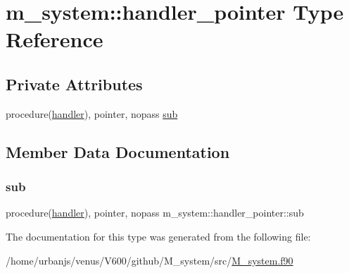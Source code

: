 \hypertarget{structm__system_1_1handler__pointer}{}\section{m\+\_\+system\+:\+:handler\+\_\+pointer Type Reference}
\label{structm__system_1_1handler__pointer}
\subsection*{Private Attributes}
\begin{DoxyCompactItemize}
\item 
procedure(\mbox{\hyperlink{interfacem__system_1_1handler}{handler}}), pointer, nopass \mbox{\hyperlink{structm__system_1_1handler__pointer_a34d58a6a4aa11ced30911c95d25eb48a}{sub}}
\end{DoxyCompactItemize}


\subsection{Member Data Documentation}
\mbox{\label{structm__system_1_1handler__pointer_a34d58a6a4aa11ced30911c95d25eb48a}} 
\subsubsection{\texorpdfstring{sub}{sub}}
{\footnotesize\ttfamily procedure(\mbox{\hyperlink{interfacem__system_1_1handler}{handler}}), pointer, nopass m\+\_\+system\+::handler\+\_\+pointer\+::sub\hspace{0.3cm}{\ttfamily [private]}}



The documentation for this type was generated from the following file\+:\begin{DoxyCompactItemize}
\item 
/home/urbanjs/venus/\+V600/github/\+M\+\_\+system/src/\mbox{\hyperlink{M__system_8f90}{M\+\_\+system.\+f90}}\end{DoxyCompactItemize}
